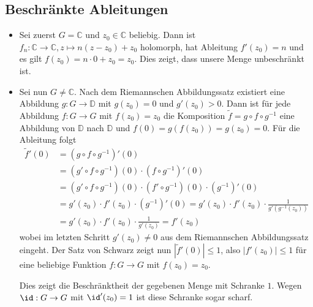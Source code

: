 \documentclass[a4paper]{article}
\begin{document}
\subsection{Beschränkte Ableitungen}

\begin{itemize}
    \item Sei zuerst $G = \mathds{C}$ und $z_0 \in \mathds{C}$ beliebig.
    Dann ist $f_n: \mathds{C} \to \mathds{C}, z \mapsto n(z - z_0) + z_0$ holomorph, hat Ableitung $f'(z_0) = n$ und es gilt $f(z_0) = n \cdot 0  + z_0 = z_0$.
    Dies zeigt, dass unsere Menge unbeschränkt ist.
    \item Sei nun $G \neq \mathds{C}$.
    Nach dem Riemannschen Abbildungssatz existiert eine Abbildung $g: G \to \mathds{D}$ mit $g(z_0) = 0$ und $g'(z_0) > 0$.
    Dann ist für jede Abbildung $f: G \to G$ mit $f(z_0) = z_0$ die Komposition $\tilde{f} = g \circ f \circ g^{-1}$ eine Abbildung von $\mathds{D}$ nach $\mathds{D}$ und $f(0) = g(f(z_0)) = g(z_0) = 0$.
    Für die Ableitung folgt
    \begin{align*}
        \tilde{f}'(0) &= (g \circ f \circ g^{-1})'(0)\\
        &= (g' \circ f \circ g^{-1})(0) \cdot (f \circ g^{-1})'(0)\\
        &= (g' \circ f \circ g^{-1})(0) \cdot (f' \circ g^{-1})(0) \cdot (g^{-1})'(0)\\
        &= g'(z_0) \cdot f'(z_0) \cdot (g^{-1})'(0) = g'(z_0) \cdot f'(z_0) \cdot \frac{1}{g'(g^{-1}(z_0))}\\
        &= g'(z_0) \cdot f'(z_0) \cdot \frac{1}{g'(z_0)} = f'(z_0)
    \end{align*}
    wobei im letzten Schritt $g'(z_0) \neq 0$ aus dem Riemannschen Abbildungssatz eingeht.
    Der Satz von Schwarz zeigt nun $|\tilde{f}'(0)| \leq 1$, also $|f'(z_0)| \leq 1$ für eine beliebige Funktion $f: G \to G$ mit $f(z_0) = z_0$.
    
    Dies zeigt die Beschränktheit der gegebenen Menge mit Schranke $1$. Wegen $\id: G \to G$ mit $\id'(z_0) = 1$ ist diese Schranke sogar scharf.


\end{itemize}
\end{document}
